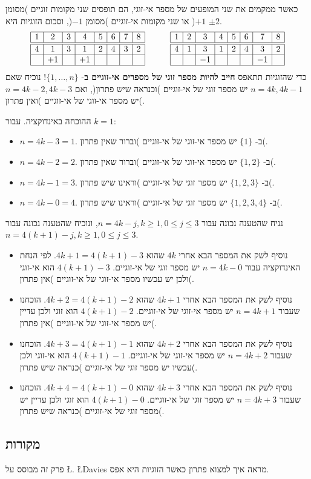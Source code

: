 כאשר ממקמים את שני המופעים של מספר אי-זוגי,  הם תופסים שני מקומות זוגיים )מסומן 
$+1$(
או שני מקומות אי-זוגיים )מסומן 
$-1$(,
וסכום הזוגיות היא
$\pm 2$.
\[
\begin{array}{|c|c|c|c|c|c|c|c|}
\hline
1&2&3&4&5&6&7&8\\
\hline\hline
4&1&3&1&2&4&3&2\\\hline
&+1&&+1&&&&\\\hline
\end{array}
\hspace{3em}
\begin{array}{|c|c|c|c|c|c|c|c|}
\hline
1&2&3&4&5&6&7&8\\
\hline\hline
4&1&3&1&2&4&3&2\\\hline
&&-1&&&&-1&\\\hline
\end{array}
\]
כדי שהזוגיות תתאפס
\textbf{חייב להיות מספר זוגי של מספרים אי-זוגיים ב}-%
$\{1,\ldots,n\}$!
נוכיח שאם 
$n=4k, 4k\!-\!1$
יש מספר זוגי של אי-זוגיים )וכנראה שיש פתרון(,
ואם
$n=4k\!-\!2, 4k\!-\!3$
יש מספר אי-זוגי של אי-זוגיים )ואין פתרון(.

ההוכחה באינדוקציה. עבור 
$k=1$:
\begin{itemize}
\item $n=4k-3=1$.
ב-%
$\{1\}$
יש מספר אי-זוגי של אי-זוגיים )וברור שאין פתרון(.
\item $n=4k-2=2$.
ב-%
$\{1,2\}$
יש מספר אי-זוגי של אי-זוגיים )וברור שאין פתרון(.
\item $n=4k-1=3$.
ב-%
$\{1,2,3\}$
יש מספר זוגי של אי-זוגיים )וראינו שיש פתרון(.
\item $n=4k-0=4$.
ב-%
$\{1,2,3,4\}$
יש מספר זוגי של אי-זוגיים )וראינו שיש פתרון(.
\end{itemize}

נניח שהטענה נכונה עבור 
$n=4k-j, k\geq 1, 0\leq j\leq 3$,
ונוכיח שהטענה נכונה עבור
$n=4(k+1)-j, k\geq 1, 0\leq j\leq 3$.
\begin{itemize}
\item
נוסיף לשק את המספר הבא אחרי 
$4k$
שהוא
$4k+1=4(k+1)-3$.
לפי הנחת האינדוקציה עבור  
$n=4k-0$
יש מספר זוגי של אי-זוגיים. 
$4(k+1)-3$
הוא אי-זוגי ולכן יש עכשיו מספר אי-זוגי של אי-זוגיים )אין פתרון(.

\item
נוסיף לשק את המספר הבא אחרי 
$4k+1$
שהוא
$4k+2=4(k+1)-2$.
הוכחנו שעבור
$n=4k+1$
יש מספר אי-זוגי של אי-זוגיים. 
$4(k+1)-2$
הוא זוגי ולכן עדיין יש מספר אי-זוגי של אי-זוגיים )אין פתרון(.

\item
נוסיף לשק את המספר הבא אחרי 
$4k+2$
שהוא
$4k+3=4(k+1)-1$.
הוכחנו שעבור
$n=4k+2$
יש מספר אי-זוגי של אי-זוגיים. 
$4(k+1)-1$
הוא אי-זוגי ולכן עכשיו יש מספר זוגי של אי-זוגיים )כנראה שיש פתרון(.

\item
נוסיף לשק את המספר הבא אחרי 
$4k+3$
שהוא
$4k+4=4(k+1)-0$.
הוכחנו שעבור
$n=4k+3$
יש מספר זוגי של אי-זוגיים. 
$4(k+1)-0$
הוא זוגי ולכן עדיין יש מספר זוגי של אי-זוגיים )כנראה שיש פתרון(.

\end{itemize}




\subsection*{מקורות}
פרק זה מבוסס על
\L{\cite{miller}}.
\L{Davies}
מראה איך למצוא פתרון כאשר הזוגיות היא אפס.
